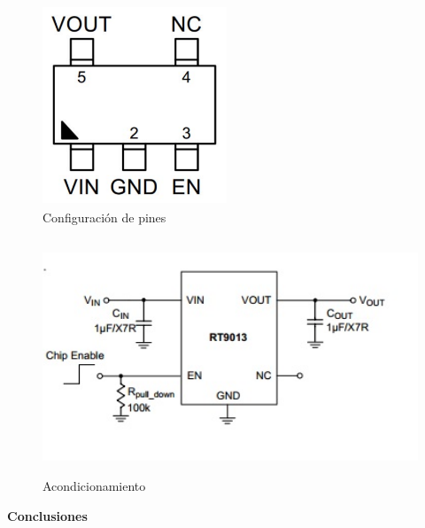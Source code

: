 \begin{figure}[H]
    \centering
    \includegraphics[width=5.5cm, height=6cm]{imagenes/esquematico RT9013.pdf}
    \caption{Configuración de pines}
    \label{imag:pines_RT9013}
\end{figure}

\begin{figure}[H]
    \centering
    \includegraphics[width=12cm, height=7cm]{imagenes/acondicionamiento RT9013.jpg}
    \caption{Acondicionamiento}
    \label{imag:acondicionamiento_RT9013}
\end{figure}


        \textbf{\Large Conclusiones}\newline
